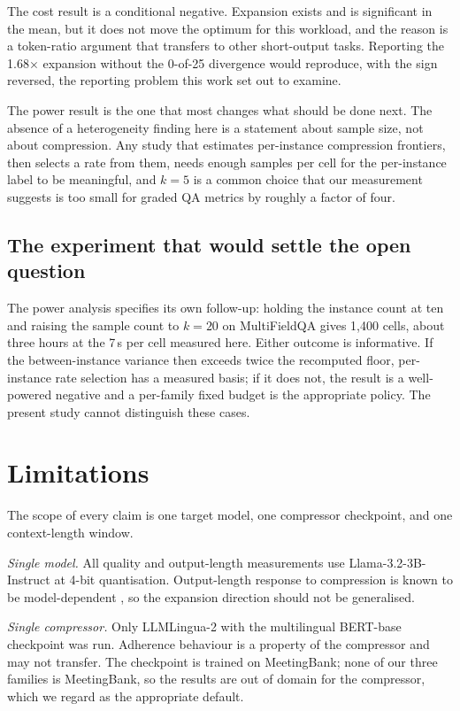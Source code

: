 \documentclass[conference]{IEEEtran}
\begin{document}
The cost result is a conditional negative. Expansion exists and is significant
in the mean, but it does not move the optimum for this workload, and the
reason is a token-ratio argument that transfers to other short-output tasks.
Reporting the 1.68$\times$ expansion without the 0-of-25 divergence would
reproduce, with the sign reversed, the reporting problem this work set out to
examine.

The power result is the one that most changes what should be done next. The
absence of a heterogeneity finding here is a statement about sample size, not
about compression. Any study that estimates per-instance compression
frontiers, then selects a rate from them, needs enough samples per cell for
the per-instance label to be meaningful, and $k=5$ is a common choice that our
measurement suggests is too small for graded QA metrics by roughly a factor of
four.

\subsection{The experiment that would settle the open question}

The power analysis specifies its own follow-up: holding the instance count at
ten and raising the sample count to $k=20$ on MultiFieldQA gives 1{,}400
cells, about three hours at the 7\,s per cell measured here. Either outcome is
informative. If the between-instance variance then exceeds twice the
recomputed floor, per-instance rate selection has a measured basis; if it does
not, the result is a well-powered negative and a per-family fixed budget is
the appropriate policy. The present study cannot distinguish these cases.

\section{Limitations}

The scope of every claim is one target model, one compressor checkpoint, and
one context-length window.

\textit{Single model.} All quality and output-length measurements use
Llama-3.2-3B-Instruct at 4-bit quantisation. Output-length response to
compression is known to be model-dependent \cite{zhang2025empirical}, so the
expansion direction should not be generalised.

\textit{Single compressor.} Only LLMLingua-2 with the multilingual BERT-base
checkpoint was run. Adherence behaviour is a property of the compressor and
may not transfer. The checkpoint is trained on MeetingBank; none of our three
families is MeetingBank, so the results are out of domain for the compressor,
which we regard as the appropriate default.
\end{document}
